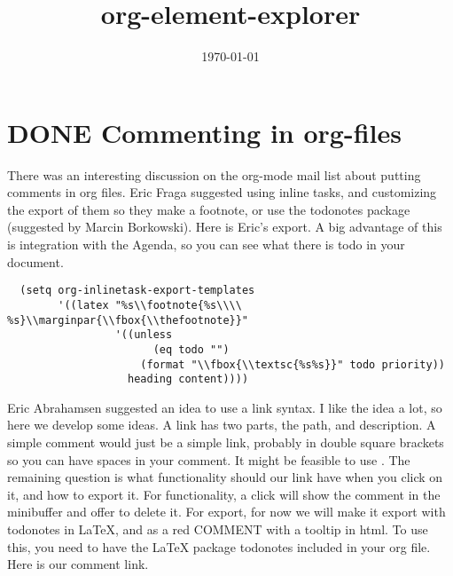 \documentclass[11pt]{article}
\date{\today}
\title{org-element-explorer}
\begin{document}
\section{{\bfseries\sffamily DONE} Commenting in org-files}
\label{sec-1}
There was an interesting discussion on the org-mode mail list about putting comments in org files. Eric Fraga suggested using inline tasks, and customizing the export of them so they make a footnote, or use the todonotes package (suggested by Marcin Borkowski). Here is Eric's export. A big advantage of this is integration with the Agenda, so you can see what there is todo in your document.

\begin{verbatim}
  (setq org-inlinetask-export-templates
        '((latex "%s\\footnote{%s\\\\ %s}\\marginpar{\\fbox{\\thefootnote}}"
                 '((unless
                       (eq todo "")
                     (format "\\fbox{\\textsc{%s%s}}" todo priority))
                   heading content))))
\end{verbatim}

Eric Abrahamsen suggested an idea to use a link syntax. I like the idea a lot, so here we develop some ideas. A link has two parts, the path, and description. A simple comment would just be a simple link, probably in double square brackets so you can have spaces in your comment.  It might be feasible to use . The remaining question is what functionality should our link have when you click on it, and how to export it. For functionality, a click will show the comment in the minibuffer and offer to delete it. For export, for now we will make it export with todonotes in \LaTeX{}, and as a red COMMENT with a tooltip in html. To use this, you need to have the \LaTeX{} package todonotes included in your org file.
Here is our comment link.
\end{document}
